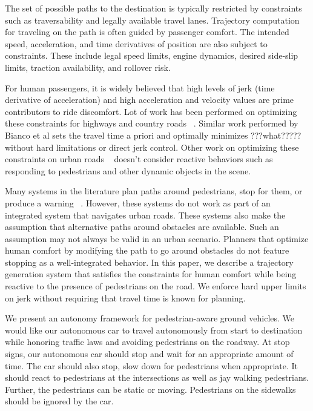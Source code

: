 \documentclass[letterpaper, 10 pt, conference]{ieeeconf}  %
\begin{document}
The set of possible paths to the destination is typically restricted
by constraints such as traversability and legally available travel lanes.
Trajectory computation for traveling on the path is often guided by passenger comfort. 
The intended speed, acceleration, and time derivatives of position are also subject to constraints.
These include legal speed limits, engine dynamics, desired side-slip limits, traction availability, and rollover risk.

For human passengers, it is widely believed that high levels of jerk (time derivative of acceleration) and high acceleration and velocity values are prime contributors to ride discomfort.
Lot of work has been performed on optimizing these constraints for highways and country roads ~\cite{ziegler14,bahram15,xu12,CHEB15CI}.
Similar work performed by Bianco et al \cite{GuarinoLoBianco2004,GuarinoLoBianco2005,Bianco2007,Bianco2009,GuarinoLoBianco2013} sets the travel time a priori and optimally minimizes ???what????? without hard limitations or direct jerk control.
Other work on optimizing these constraints on urban roads ~\cite{Rastelli14,Li15} doesn't consider reactive behaviors such as responding to pedestrians and other dynamic objects in the scene.

Many systems in the literature plan paths around pedestrians, stop for them, or produce a warning ~\cite{pradalier05,benenson06,gu14,mogelmose15,johnson13}. However, these systems do not work as part of an integrated system that navigates urban roads.
These systems also make the assumption that alternative paths around obstacles are available. Such an assumption may not always be valid in an urban scenario.
Planners that optimize human comfort by modifying the path to go around obstacles \cite{Villagra2012,Villagra2012a} do not feature stopping as a well-integrated behavior.
In this paper, we describe a trajectory generation system that satisfies the constraints for human comfort while being reactive to the presence of pedestrians on the road. We enforce hard upper limits on jerk without requiring that travel time is known for planning.

We present an autonomy framework for pedestrian-aware ground vehicles.
We would like our autonomous car to travel autonomously from start to destination while honoring traffic laws and avoiding pedestrians on the roadway.
At stop signs, our autonomous car should stop and wait for an appropriate amount of time.
The car should also stop, slow down for pedestrians when appropriate.
It should react to pedestrians at the intersections as well as jay walking pedestrians.
Further, the pedestrians can be static or moving.
Pedestrians on the sidewalks should be ignored by the car.
\end{document}
